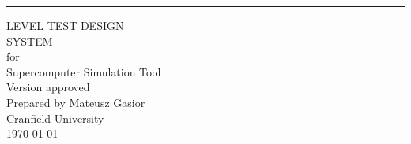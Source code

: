 \begin{flushright}
    \rule{16cm}{5pt}\vskip1cm
    \begin{bfseries}
        \Huge{LEVEL TEST DESIGN \\ SYSTEM}\\
        \vspace{1.9cm}
        for\\
        \vspace{1.9cm}
	    Supercomputer Simulation Tool\\
        \vspace{1.9cm}
        \LARGE{Version \myversion approved}\\
        \vspace{1.9cm}
        Prepared by Mateusz Gasior\\
        \vspace{1.9cm}
        Cranfield University\\
        \vspace{1.9cm}
        \today\\
    \end{bfseries}
\end{flushright}